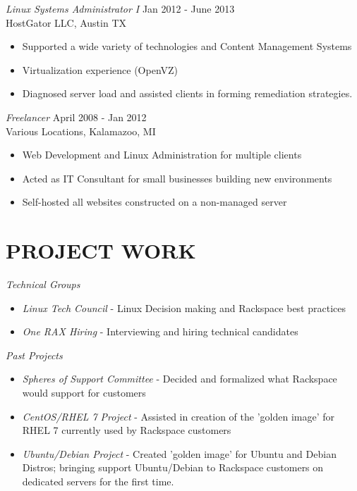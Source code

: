 \documentclass[margin]{res}
\begin{document}
\begin{resume}
              {\sl Linux Systems Administrator I} \hfill            Jan 2012 - June 2013 \\
                HostGator LLC,  Austin TX                
                \begin{itemize}  \itemsep -2pt
                \item Supported a wide variety of technologies and Content Management Systems
                \item Virtualization experience (OpenVZ)
		\item Diagnosed server load and assisted clients in forming remediation strategies. 
		\end{itemize} 

		{\sl Freelancer} \hfill        April 2008 - Jan 2012 \\
                Various Locations, Kalamazoo, MI
		\begin{itemize} \itemsep -2pt
                \item Web Development and Linux Administration for multiple clients
                \item Acted as IT Consultant for small businesses building new environments
                \item Self-hosted all websites constructed on a non-managed server
                \end{itemize} 
 
\section{PROJECT WORK}   
		{\sl Technical Groups} 
		\begin{itemize} \itemsep -2pt  
		\item {\it Linux Tech Council} - Linux Decision making and Rackspace best practices 
		\item {\it One RAX Hiring} - Interviewing and hiring technical candidates 
		\end{itemize}
		{\sl Past Projects}
		\begin{itemize} \itemsep -2pt
		\item {\it Spheres of Support Committee} - Decided and formalized what Rackspace would support for customers
		\item {\it CentOS/RHEL 7 Project}  - Assisted in creation of the 'golden image' for RHEL 7 currently used by Rackspace customers
		\item {\it Ubuntu/Debian Project} - Created 'golden image' for Ubuntu and Debian Distros; bringing support Ubuntu/Debian to Rackspace customers on dedicated servers for the first time.
		\end{itemize}

\end{resume}
\end{document}
